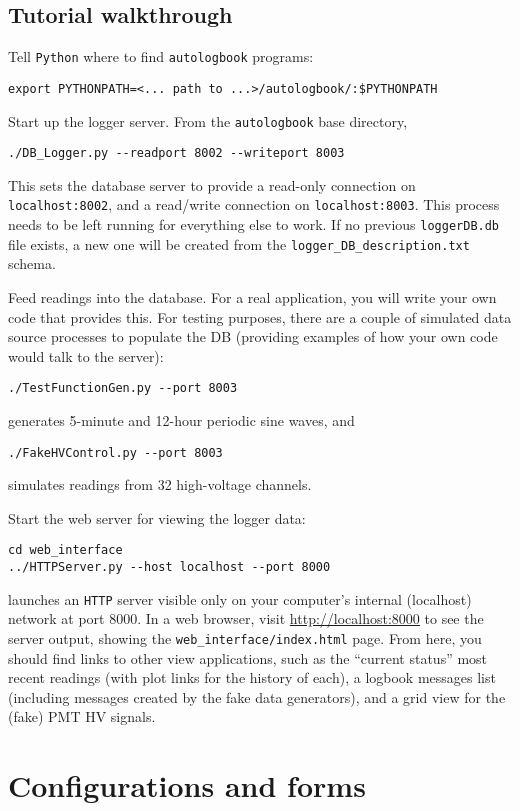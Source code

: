 \documentclass[12pt,english]{article}
\newcommand{\cd}[1]{\texttt{#1}}
\begin{document}
%
%
\subsection{Tutorial walkthrough}

Tell \cd{Python} where to find \cd{autologbook} programs:
\begin{verbatim}
export PYTHONPATH=<... path to ...>/autologbook/:$PYTHONPATH
\end{verbatim}
Start up the logger server.
From the \cd{autologbook} base directory,
\begin{verbatim}
./DB_Logger.py --readport 8002 --writeport 8003
\end{verbatim}
This sets the database server to provide a read-only connection on \cd{localhost:8002},
	and a read/write connection on \cd{localhost:8003}.
This process needs to be left running for everything else to work.
If no previous \cd{loggerDB.db} file exists,
	a new one will be created from the \cd{logger\_DB\_description.txt} schema.

Feed readings into the database.
For a real application, you will write your own code that provides this.
For testing purposes, there are a couple of simulated data source processes to populate the DB
	(providing examples of how your own code would talk to the server):
\begin{verbatim}
./TestFunctionGen.py --port 8003
\end{verbatim}
generates 5-minute and 12-hour periodic sine waves, and
\begin{verbatim}
./FakeHVControl.py --port 8003
\end{verbatim}
simulates readings from 32 high-voltage channels.

Start the web server for viewing the logger data:
\begin{verbatim}
cd web_interface
../HTTPServer.py --host localhost --port 8000
\end{verbatim}
launches an \cd{HTTP} server visible only on your computer's internal (localhost) network at port 8000.
In a web browser, visit \url{http://localhost:8000} to see the server output,
	showing the \cd{web\_interface/index.html} page.
From here, you should find links to other view applications,
	such as the ``current status'' most recent readings (with plot links for the history of each),
	a logbook messages list (including messages created by the fake data generators),
	and a grid view for the (fake) PMT HV signals.

%
%
%
\section{Configurations and forms}
\end{document}
